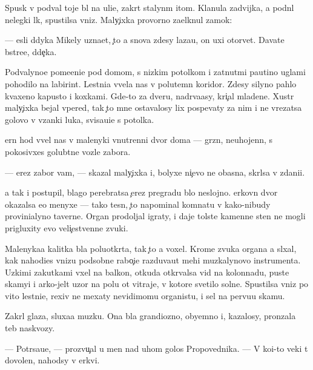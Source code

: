\documentclass[10pt]{book}
\begin{document}
Spusk v podval toje b{\yi}l na uli{\q}e, zakr{\yi}t{\yi}{\y} stalyn{\yi}m {\x}itom. Kla{\q}nula zadvijka, {\y}a podn{\ia}l nelegki{\y} l{\iu}k, spustilsa vniz. Maly{\c}ixka provorno za{\x}elknul zamok:

— {\Y}esli d{\ia}dyka Mikely uzna{\y}et, {\c}to {\y}a snova zdesy laza{\y}u, on uxi otorvet. Dava{\y}te b{\yi}stre{\y}e, d{\ia}de{\c}ka.

Podvalyno{\y}e pome{\x}eni{\y}e pod domom, s nizkim potolkom i zat{\ia}nut{\yi}mi pautino{\y} uglami pohodilo na labirint. Lestni{\q}a v{\yi}vela nas v polutemn{\yi}{\y} koridor. Zdesy silyno pahlo kvaxeno{\y} kapusto{\y} i koxkami. Gde-to za dver{\y}u, nadr{\yi}va{\y}asy, kri{\c}al mladene{\q}. Xustr{\yi}{\y} maly{\c}ixka bejal vpered, tak {\c}to mne ostavalosy lix pospevaty za nim i ne vrezatsa golovo{\y} v v{\ia}zanki luka, svisa{\y}u{\x}i{\y}e s potolka.

{\C}ern{\yi}{\y} hod v{\yi}vel nas v malenyki{\y} vnutrenni{\y} dvor doma — gr{\ia}zn{\yi}{\y}, neuhojenn{\yi}{\y}, s pokosivxe{\y}s{\ia} golub{\ia}tne{\y} vozle zabora.

— {\C}erez zabor vam, — skazal maly{\c}ixka i, bolyxe ni{\c}evo ne ob{\y}asn{\ia}{\y}a, skr{\yi}lsa v zdani{\y}i.

{\Y}a tak i postupil, blago perebratsa {\c}erez pregradu b{\yi}lo neslojno. {\Q}erkovn{\yi}{\y} dvor okazalsa {\y}e{\x}o menyxe — tako{\y} tesn{\yi}{\y}, {\c}to napominal komnatu v kako{\y}-nibudy provin{\q}ialyno{\y} taverne. Organ prodoljal igraty, i daje tolst{\yi}{\y}e kamenn{\yi}{\y}e sten{\yi} ne mogli prigluxity {\y}evo veli{\c}estvenn{\yi}{\y}e zvuki.

Malenyka{\y}a kalitka b{\yi}la poluotkr{\yi}ta, tak {\c}to {\y}a voxel. Krome zvuka organa {\y}a sl{\yi}xal, kak nahod{\ia}{\x}i{\y}es{\ia} vnizu podsobn{\yi}{\y}e rabo{\c}i{\y}e razduva{\y}ut mehi muz{\yi}kalynovo instrumenta. Uzkimi zakutkami v{\yi}xel na balkon, otkuda otkr{\yi}valsa vid na kolonnadu, pust{\yi}{\y}e skamyi i {\y}arko-jelt{\yi}{\y} uzor na polu ot vitraje{\y}, v kotor{\yi}{\y}e svetilo soln{\q}e. Spustilsa vniz po vito{\y} lestni{\q}e, rexiv ne mexaty nevidimomu organistu, i sel na pervu{\y}u skam{\y}u.

Zakr{\yi}l glaza, sluxa{\y}a muz{\yi}ku. Ona b{\yi}la grandiozno{\y}, obyemno{\y} i, kazalosy, pronzala teb{\ia} naskvozy.

— Potr{\ia}sa{\y}u{\x}e, — prozvu{\c}al u men{\ia} nad uhom golos Propovednika. — V ko{\y}i-to veki t{\yi} dovolen, nahod{\ia}sy v {\q}erkvi.
\end{document}

